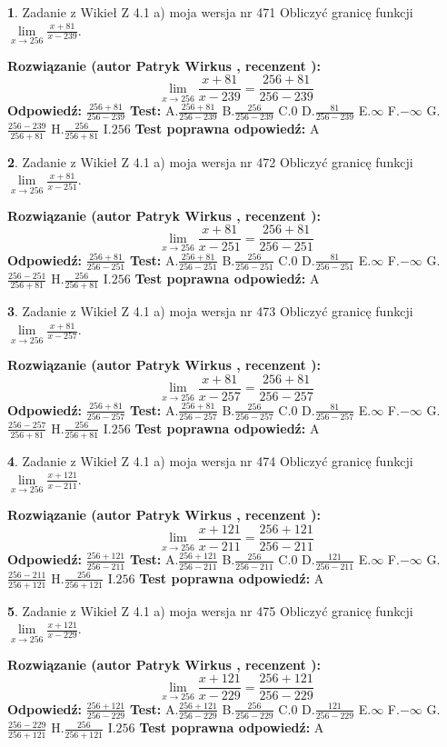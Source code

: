\documentclass[12pt, a4paper]{article}
\theoremstyle{definition} %
\newtheorem{zad}{}
\newcommand{\zadStart}[1]{\begin{zad}#1\newline}
\newcommand{\zadStop}{\end{zad}}
\newcommand{\rozwStart}[2]{\noindent \textbf{Rozwiązanie (autor #1 , recenzent #2): }\newline}
\newcommand{\rozwStop}{\newline}
\newcommand{\odpStart}{\noindent \textbf{Odpowiedź:}\newline}
\newcommand{\odpStop}{\newline}
\newcommand{\testStart}{\noindent \textbf{Test:}\newline}
\newcommand{\testStop}{\newline}
\newcommand{\kluczStart}{\noindent \textbf{Test poprawna odpowiedź:}\newline}
\newcommand{\kluczStop}{\newline}
\begin{document}
\zadStart{Zadanie z Wikieł Z 4.1 a) moja wersja nr 471}
Obliczyć granicę funkcji $\lim\limits_{x\to256}\frac{x+81}{x-239}$.
\zadStop
\rozwStart{Patryk Wirkus}{}
$$\lim\limits_{x\to256}\frac{x+81}{x-239} = \frac{256+81}{256-239}$$
\rozwStop
\odpStart
$\frac{256+81}{256-239}$
\odpStop
\testStart
A.$\frac{256+81}{256-239}$
B.$\frac{256}{256-239}$
C.$0$
D.$\frac{81}{256-239}$
E.$\infty$
F.$-\infty$
G.$\frac{256-239}{256+81}$
H.$\frac{256}{256+81}$
I.$256$
\testStop
\kluczStart
A
\kluczStop



\zadStart{Zadanie z Wikieł Z 4.1 a) moja wersja nr 472}
Obliczyć granicę funkcji $\lim\limits_{x\to256}\frac{x+81}{x-251}$.
\zadStop
\rozwStart{Patryk Wirkus}{}
$$\lim\limits_{x\to256}\frac{x+81}{x-251} = \frac{256+81}{256-251}$$
\rozwStop
\odpStart
$\frac{256+81}{256-251}$
\odpStop
\testStart
A.$\frac{256+81}{256-251}$
B.$\frac{256}{256-251}$
C.$0$
D.$\frac{81}{256-251}$
E.$\infty$
F.$-\infty$
G.$\frac{256-251}{256+81}$
H.$\frac{256}{256+81}$
I.$256$
\testStop
\kluczStart
A
\kluczStop



\zadStart{Zadanie z Wikieł Z 4.1 a) moja wersja nr 473}
Obliczyć granicę funkcji $\lim\limits_{x\to256}\frac{x+81}{x-257}$.
\zadStop
\rozwStart{Patryk Wirkus}{}
$$\lim\limits_{x\to256}\frac{x+81}{x-257} = \frac{256+81}{256-257}$$
\rozwStop
\odpStart
$\frac{256+81}{256-257}$
\odpStop
\testStart
A.$\frac{256+81}{256-257}$
B.$\frac{256}{256-257}$
C.$0$
D.$\frac{81}{256-257}$
E.$\infty$
F.$-\infty$
G.$\frac{256-257}{256+81}$
H.$\frac{256}{256+81}$
I.$256$
\testStop
\kluczStart
A
\kluczStop



\zadStart{Zadanie z Wikieł Z 4.1 a) moja wersja nr 474}
Obliczyć granicę funkcji $\lim\limits_{x\to256}\frac{x+121}{x-211}$.
\zadStop
\rozwStart{Patryk Wirkus}{}
$$\lim\limits_{x\to256}\frac{x+121}{x-211} = \frac{256+121}{256-211}$$
\rozwStop
\odpStart
$\frac{256+121}{256-211}$
\odpStop
\testStart
A.$\frac{256+121}{256-211}$
B.$\frac{256}{256-211}$
C.$0$
D.$\frac{121}{256-211}$
E.$\infty$
F.$-\infty$
G.$\frac{256-211}{256+121}$
H.$\frac{256}{256+121}$
I.$256$
\testStop
\kluczStart
A
\kluczStop



\zadStart{Zadanie z Wikieł Z 4.1 a) moja wersja nr 475}
Obliczyć granicę funkcji $\lim\limits_{x\to256}\frac{x+121}{x-229}$.
\zadStop
\rozwStart{Patryk Wirkus}{}
$$\lim\limits_{x\to256}\frac{x+121}{x-229} = \frac{256+121}{256-229}$$
\rozwStop
\odpStart
$\frac{256+121}{256-229}$
\odpStop
\testStart
A.$\frac{256+121}{256-229}$
B.$\frac{256}{256-229}$
C.$0$
D.$\frac{121}{256-229}$
E.$\infty$
F.$-\infty$
G.$\frac{256-229}{256+121}$
H.$\frac{256}{256+121}$
I.$256$
\testStop
\kluczStart
A
\kluczStop
\end{document}
